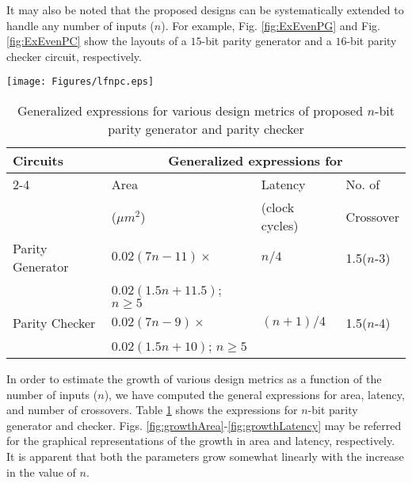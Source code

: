 \documentclass[conference]{IEEEtran}
\begin{document}
It may also be noted that the proposed designs can be systematically extended to handle any number of inputs ($n$).
For example, Fig. \ref{fig:ExEvenPG} and Fig. \ref{fig:ExEvenPC} show the layouts of a $15$-bit parity generator and a $16$-bit parity checker circuit, respectively.
\begin{figure*}[ht!]
\texttt{[image: Figures/lfnpc.eps]}
\vspace{-3.6cm}
\caption{\small Layout of the proposed 16-bit even parity checker}
\label{fig:ExEvenPC}
\end{figure*}
\begin{table}[h!]
 \begin{center}
 \scriptsize
 \caption{\small Generalized expressions for various design metrics of proposed $n$-bit parity generator and parity checker}
  \label{tab:propcomp}

\begin{tabular}{|l|l|l|l|} \hline


     
      Circuits&\multicolumn{3}{c|}{Generalized expressions for}\\\cline{2-4}& Area  & Latency  & No. of \\
     & ($\mu m^2$) & (clock cycles) &Crossover\\ 
  \hline
          
     Parity Generator & $0.02(7n-11) \times $ & $n/4$ & 1.5($n$-3)\\
                      & $0.02(1.5n+11.5)$; $n\geq5$ &       &  \\
     \hline 
     Parity Checker & $0.02(7n-9) \times $ & $(n+1)/4$ & 1.5($n$-4)\\ 
                     & $0.02(1.5n+10)$; $n\geq5$ &  & \\
    \hline
\end{tabular}
\end{center}
\end{table}
In order to estimate the growth of various design metrics as a function of the number of inputs ($n$), we have computed the general expressions for area, latency, and number of crossovers.
Table \ref{tab:propcomp} shows the expressions for $n$-bit parity generator and checker.
Figs. \ref{fig:growthArea}-\ref{fig:growthLatency} may be referred for the graphical representations of the growth in area and latency, respectively.
It is apparent that both the parameters grow somewhat linearly with the increase in the value of $n$.
\end{document}

